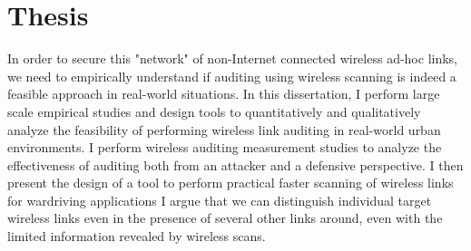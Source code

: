 \begin{comment}
Even wireless hardware properties are ineffective at identifying or unobfuscating these ad-hoc links. We can measure wireless signal properties(e.g. CFO, CSI) from the received wireless scan packets. These wireless signal properties are due to manufacturing variations in the wireless hardware and therefore represent a particular

The distributed nature of these non-Internet connected links makes it impossible to audit them using existing wireless device fingerprinting techniques [cite Danny, Louis]. These links are geographically spread throughout cities and nations, and therefore there isn’t a central vantage point to observe the links. Wireless scanning through wardriving can be used to perform  measurement campaigns throughout large urban areas. Unfortunately, existing wardriving techniques are insufficient because wireless scanning is too slow to comprehensively discover all wireless links across entire metropolitan areas. The process of wireless scanning can take several tens of seconds to enumerate all wireless links nearby; this is too slow when scanning across urban areas in a moving vehicle and leads to missed devices, which can even be misconstrued as evidence of a device actually being hidden or obfuscated in the noise.





and perhaps some basic hardware signal properties like CFO, IQ offset at the physical layer.

hardware variations across two same devices very similar so hard to differentiate



we dont get the spatial context which can only be gotten by doing wardriving

Existing techniques for wireless device auditing,
\end{comment}

\section{Thesis}
In order to secure this "network" of non-Internet connected wireless ad-hoc links, we need to empirically understand if auditing using wireless scanning is indeed a feasible approach in real-world situations.
%
In this dissertation, I perform large scale empirical studies and design tools to quantitatively and qualitatively analyze the feasibility of performing wireless link auditing in real-world urban environments.
%
I perform wireless auditing measurement studies to analyze the effectiveness of auditing both from an attacker and a defensive perspective.
%
I then present the design of a tool to perform practical faster scanning of wireless links for wardriving applications
%
I argue that we can distinguish individual target wireless links even in the presence of several other links around, even with the limited information revealed by wireless scans.

